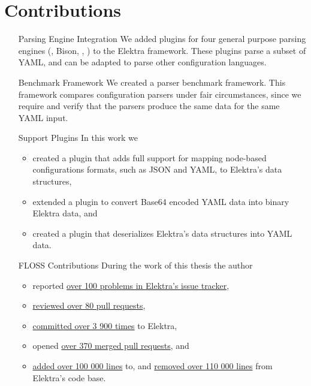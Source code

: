\section{Contributions}

\begin{itemize}[style=multiline, leftmargin=3cm, font=\bfseries]
  \item[Parsing Engine Integration] We added plugins for four general purpose parsing engines (, Bison, , ) to the Elektra framework. These plugins parse a subset of YAML, and can be adapted to parse other configuration languages.

  \item[Benchmark Framework] We created a parser benchmark framework. This framework compares configuration parsers under fair circumstances, since we require and verify that the parsers produce the same data for the same YAML input.

  \item[Support Plugins] In this work we
  \begin{itemize}
    \item created a plugin that adds full support for mapping node-based configurations formats, such as \gls{JSON} and YAML, to Elektra’s data structures,
    \item extended a plugin to convert Base64 encoded YAML data into binary Elektra data, and
    \item created a plugin that deserializes Elektra’s data structures into YAML data.
  \end{itemize}

  \item[\gls{FLOSS} Contributions] During the work of this thesis the author

  \begin{itemize}
    \item reported \href{https://github.com/ElektraInitiative/libelektra/issues/created_by/sanssecours}{over 100 problems in Elektra’s issue tracker},
    \item \href{https://github.com/ElektraInitiative/libelektra/pulls?q=is:pr+is:open+reviewed-by:sanssecours}{reviewed over 80 pull requests},
    \item \href{https://github.com/ElektraInitiative/libelektra/graphs/contributors?from=2012-04-01&to=2019-10-24&type=c}{committed over 3 900 times} to Elektra,
    \item opened \href{https://github.com/ElektraInitiative/libelektra/pulls?&q=is:merged+is:pr+author:sanssecours+}{over 370 merged pull requests}, and
    \item \href{https://github.com/ElektraInitiative/libelektra/graphs/contributors?from=2012-04-01&to=2019-10-24&type=a}{added over 100 000 lines} to, and \href{https://github.com/ElektraInitiative/libelektra/graphs/contributors?from=2012-04-01&to=2019-10-24&type=d}{removed over 110 000 lines} from Elektra’s code base.
  \end{itemize}
\end{itemize}

